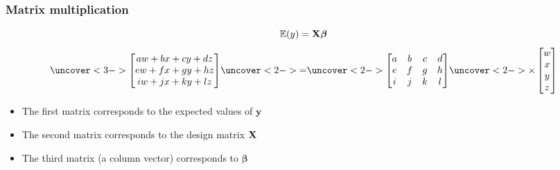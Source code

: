 \documentclass[color=usenames,dvipsnames]{beamer}\usepackage[]{graphicx}\usepackage[]{color}
\begin{document}
\begin{frame}
  \frametitle{Matrix multiplication}
  \Large
  \begin{center}
    \[
      \mathbb{E}(y) = {\bf X}{\bm \beta}
    \]
    \[
    \uncover<3->{
    \begin{bmatrix}
      aw + bx + cy + dz \\
      ew + fx + gy + hz \\
      iw + jx + ky + lz %
    \end{bmatrix}
    }
    \uncover<2->{=}
    \uncover<2->{
    \begin{bmatrix}
      a & b & c & d \\
      e & f & g & h \\
      i & j & k & l %
    \end{bmatrix}
    }
    \uncover<2->{
    \times
    \begin{bmatrix}
      w \\
      x \\
      y \\
      z
    \end{bmatrix}
    }
    \]
  \end{center}
  \normalsize
    \begin{itemize}
      \item<4-> The first matrix corresponds to the expected values of $\bm y$
      \item<4-> The second matrix corresponds to the design matrix {$\bf X$}
      \item<4-> The third matrix (a column vector) corresponds to {$\bm \beta$}
    \end{itemize}
\end{frame}
\end{document}

